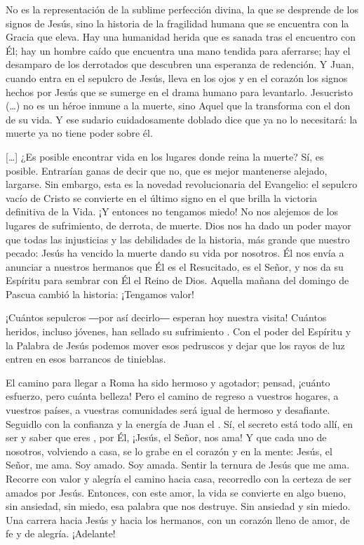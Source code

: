 \begin{body}
No es la representación de la sublime perfección divina, la que se desprende de los signos de Jesús, sino la historia de la fragilidad humana que se encuentra con la Gracia que eleva. Hay una humanidad herida que es sanada tras el encuentro con Él; hay un hombre caído que encuentra una mano tendida para aferrarse; hay el desamparo de los derrotados que descubren una esperanza de redención. Y Juan, cuando entra en el sepulcro de Jesús, lleva en los ojos y en el corazón los signos hechos por Jesús que se sumerge en el drama humano para levantarlo. Jesucristo (\ldots) no es un héroe inmune a la muerte, sino Aquel que la transforma con el don de su vida. Y ese sudario cuidadosamente doblado dice que ya no lo necesitará: la muerte ya no tiene poder sobre él.

[\ldots] ¿Es posible encontrar vida en los lugares donde reina la muerte? Sí, es posible. Entrarían ganas de decir que no, que es mejor mantenerse alejado, largarse. Sin embargo, esta es la novedad revolucionaria del Evangelio: el sepulcro vacío de Cristo se convierte en el último signo en el que brilla la victoria definitiva de la Vida. ¡Y entonces no tengamos miedo! No nos alejemos de los lugares de sufrimiento, de derrota, de muerte. Dios nos ha dado un poder mayor que todas las injusticias y las debilidades de la historia, más grande que nuestro pecado: Jesús ha vencido la muerte dando su vida por nosotros. Él nos envía a anunciar a nuestros hermanos que Él es el Resucitado, es el Señor, y nos da su Espíritu para sembrar con Él el Reino de Dios. Aquella mañana del domingo de Pascua cambió la historia: ¡Tengamos valor!

¡Cuántos sepulcros ―por así decirlo― esperan hoy nuestra visita! Cuántos heridos, incluso jóvenes, han sellado su sufrimiento . Con el poder del Espíritu y la Palabra de Jesús podemos mover esos pedruscos y dejar que los rayos de luz entren en esos barrancos de tinieblas.

El camino para llegar a Roma ha sido hermoso y agotador; pensad, ¡cuánto esfuerzo, pero cuánta belleza! Pero el camino de regreso a vuestros hogares, a vuestros países, a vuestras comunidades será igual de hermoso y desafiante. Seguidlo con la confianza y la energía de Juan el . Sí, el secreto está todo allí, en ser y saber que eres ,  por Él, ¡Jesús, el Señor, nos ama! Y que cada uno de nosotros, volviendo a casa, se lo grabe en el corazón y en la mente: Jesús, el Señor, me ama. Soy amado. Soy amada. Sentir la ternura de Jesús que me ama. Recorre con valor y alegría el camino hacia casa, recorredlo con la certeza de ser amados por Jesús. Entonces, con este amor, la vida se convierte en algo bueno, sin ansiedad, sin miedo, esa palabra que nos destruye. Sin ansiedad y sin miedo. Una carrera hacia Jesús y hacia los hermanos, con un corazón lleno de amor, de fe y de alegría. ¡Adelante!
\end{body}

